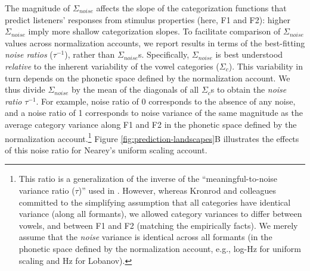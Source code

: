 \documentclass[preprint]{JASA}
\begin{document}
The magnitude of \(\Sigma_{noise}\) affects the slope of the categorization functions that predict listeners' responses from stimulus properties (here, F1 and F2): higher \(\Sigma_{noise}\) imply more shallow categorization slopes. To facilitate comparison of \(\Sigma_{noise}\) values across normalization accounts, we report results in terms of the best-fitting \emph{noise ratios} (\(\tau^{-1}\)), rather than \(\Sigma_{noise}\)s. Specifically, \(\Sigma_{noise}\) is best understood \emph{relative} to the inherent variability of the vowel categories (\(\Sigma_c\)). This variability in turn depends on the phonetic space defined by the normalization account. We thus divide \(\Sigma_{noise}\) by the mean of the diagonals of all \(\Sigma_c\)s to obtain the \emph{noise ratio} \(\tau^{-1}\). For example, noise ratio of 0 corresponds to the absence of any noise, and a noise ratio of 1 corresponds to noise variance of the same magnitude as the average category variance along F1 and F2 in the phonetic space defined by the normalization account.\footnote{This ratio is a generalization of the inverse of the ``meaningful-to-noise variance ratio (\(\tau\))'' used in \citet{kronrod2016}. However, whereas Kronrod and colleagues committed to the simplifying assumption that all categories have identical variance (along all formants), we allowed category variances to differ between vowels, and between F1 and F2 (matching the empirically facts). We merely assume that the \emph{noise} variance is identical across all formants (in the phonetic space defined by the normalization account, e.g., log-Hz for uniform scaling and Hz for Lobanov).} Figure \ref{fig:prediction-landscapes}B illustrates the effects of this noise ratio for Nearey's uniform scaling account.
\end{document}
